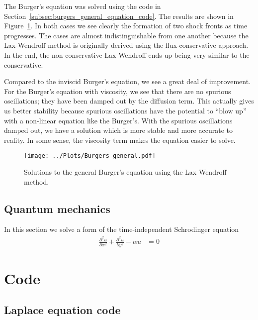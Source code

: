 \documentclass[twocolumn]{myarticle}
\begin{document}
The Burger's equation was solved using the code in Section~\ref{subsec:burgers_general_equation_code}.
The results are shown in Figure~\ref{fig:burgers_general}.
In both cases we see clearly the formation of two shock fronts as time progresses.
The cases are almost indistinguishable from one another because the Lax-Wendroff method is originally derived using the flux-conservative approach.
In the end, the non-conservative Lax-Wendroff ends up being very similar to the conservative.

Compared to the inviscid Burger's equation, we see a great deal of improvement.
For the Burger's equation with viscosity, we see that there are no spurious oscillations; they have been damped out by the diffusion term.
This actually gives us better stability because spurious oscillations have the potential to ``blow up'' with a non-linear equation like the Burger's.
With the spurious oscillations damped out, we have a solution which is more stable and more accurate to reality.
In some sense, the viscosity term makes the equation easier to solve.

\begin{figure}[ht]
    \centering
    \texttt{[image: ../Plots/Burgers\_general.pdf]}
    \caption{Solutions to the general Burger's equation using the Lax Wendroff method.}
    \label{fig:burgers_general}
\end{figure}


\subsection{Quantum mechanics}
\label{subsec:quantum_mechanics}

In this section we solve a form of the time-independent Schrodinger equation
\begin{align}
    \frac{\partial^2 u}{\partial x^2} + \frac{\partial^2 u}{\partial y^2} - \alpha u &= 0
\end{align}



\onecolumn



\section{Code}
\label{sec:code}

\subsection{Laplace equation code}
\label{subsec:laplace_equation_code}
\end{document}
